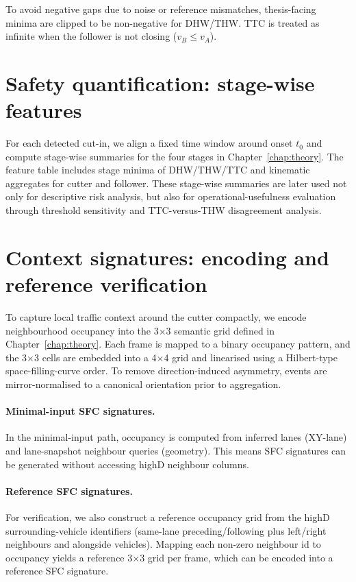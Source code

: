 \documentclass[12pt,a4paper,twoside,openright]{report}
\begin{document}
    To avoid negative gaps due to noise or reference mismatches, thesis-facing minima are clipped to be non-negative for DHW/THW. TTC is treated as infinite when the follower is not closing ($v_B \leq v_A$).

    \section{Safety quantification: stage-wise features}
    For each detected cut-in, we align a fixed time window around onset $t_0$ and compute stage-wise summaries for the four stages in Chapter~\ref{chap:theory}. The feature table includes stage minima of DHW/THW/TTC and kinematic aggregates for cutter and follower. These stage-wise summaries are later used not only for descriptive risk analysis, but also for operational-usefulness evaluation through threshold sensitivity and TTC-versus-THW disagreement analysis.

    \section{Context signatures: encoding and reference verification}
    To capture local traffic context around the cutter compactly, we encode neighbourhood occupancy into the 3$\times$3 semantic grid defined in Chapter~\ref{chap:theory}. Each frame is mapped to a binary occupancy pattern, and the 3$\times$3 cells are embedded into a 4$\times$4 grid and linearised using a Hilbert-type space-filling-curve order. To remove direction-induced asymmetry, events are mirror-normalised to a canonical orientation prior to aggregation.

    \paragraph{Minimal-input SFC signatures.}
    In the minimal-input path, occupancy is computed from inferred lanes (XY-lane) and lane-snapshot neighbour queries (geometry). This means SFC signatures can be generated without accessing highD neighbour columns.

    \paragraph{Reference SFC signatures.}
    For verification, we also construct a reference occupancy grid from the highD surrounding-vehicle identifiers (same-lane preceding/following plus left/right neighbours and alongside vehicles). Mapping each non-zero neighbour id to occupancy yields a reference 3$\times$3 grid per frame, which can be encoded into a reference SFC signature.
\end{document}
